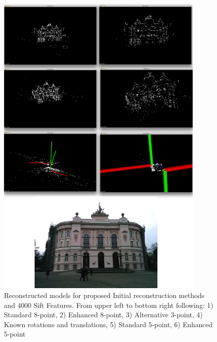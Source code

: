 \begin{figure}[p]
    \centering
    \includegraphics[width=0.9\textwidth]{uni4000Comparison}
    \caption{Reconstructed models for proposed Initial reconstruction methods and 4000 Sift Features. From upper left to bottom right following: 1) Standard 8-point, 2) Enhanced 8-point, 3) Alternative 3-point, 4) Known rotations and translations, 5) Standard 5-point, 6) Enhanced 5-point}
    \label{fig:uni4000Comparison}
\end{figure}
